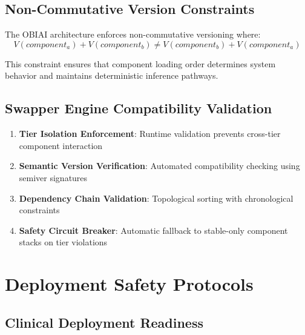 \documentclass[11pt,letterpaper]{article}
\begin{document}
\subsection{Non-Commutative Version Constraints}

The OBIAI architecture enforces non-commutative versioning where:
\begin{equation}
V(component_a) + V(component_b) \neq V(component_b) + V(component_a)
\end{equation}

This constraint ensures that component loading order determines system behavior and maintains deterministic inference pathways.

\subsection{Swapper Engine Compatibility Validation}

\begin{enumerate}
    \item \textbf{Tier Isolation Enforcement}: Runtime validation prevents cross-tier component interaction
    \item \textbf{Semantic Version Verification}: Automated compatibility checking using semiver signatures
    \item \textbf{Dependency Chain Validation}: Topological sorting with chronological constraints
    \item \textbf{Safety Circuit Breaker}: Automatic fallback to stable-only component stacks on tier violations
\end{enumerate}

\section{Deployment Safety Protocols}
\label{sec:safety}

\subsection{Clinical Deployment Readiness}
\end{document}
